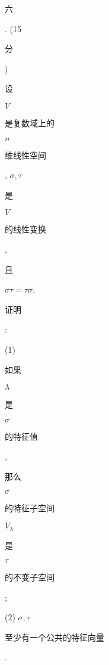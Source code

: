 \documentclass[10pt]{article}
\begin{document}
\begin{CJK}{UTF8}{mj}六\end{CJK}. (15 \begin{CJK}{UTF8}{mj}分\end{CJK}) \begin{CJK}{UTF8}{mj}设\end{CJK} $V$ \begin{CJK}{UTF8}{mj}是复数域上的\end{CJK} $n$ \begin{CJK}{UTF8}{mj}维线性空间\end{CJK}, $\sigma, \tau$ \begin{CJK}{UTF8}{mj}是\end{CJK} $V$ \begin{CJK}{UTF8}{mj}的线性变换\end{CJK}, \begin{CJK}{UTF8}{mj}且\end{CJK} $\sigma \tau=\tau \sigma$. \begin{CJK}{UTF8}{mj}证明\end{CJK}:

(1) \begin{CJK}{UTF8}{mj}如果\end{CJK} $\lambda$ \begin{CJK}{UTF8}{mj}是\end{CJK} $\sigma$ \begin{CJK}{UTF8}{mj}的特征值\end{CJK}, \begin{CJK}{UTF8}{mj}那么\end{CJK} $\sigma$ \begin{CJK}{UTF8}{mj}的特征子空间\end{CJK} $V_{\lambda}$ \begin{CJK}{UTF8}{mj}是\end{CJK} $\tau$ \begin{CJK}{UTF8}{mj}的不变子空间\end{CJK};

(2) $\sigma, \tau$ \begin{CJK}{UTF8}{mj}至少有一个公共的特征向量\end{CJK}.
\end{document}
